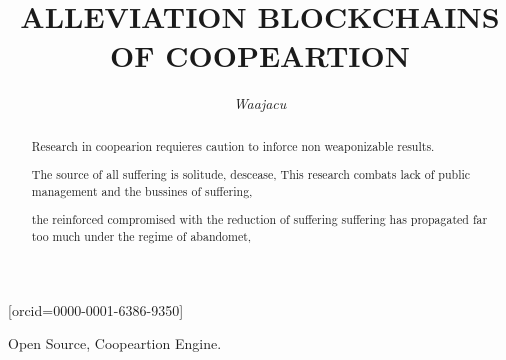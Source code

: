 \documentclass[a4paper,fleqn]{cas-sc}
\begin{document}
\let\WriteBookmarks\relax
\def\floatpagepagefraction{1}
\def\textpagefraction{.001}

\title[mode = title]{ALLEVIATION BLOCKCHAINS OF COOPEARTION}




  \author[1]{\textit{Waajacu}}[orcid=0000-0001-6386-9350]
  \cormark[1] 


  \address[1]{Santiago Restrepo Ruiz, Colombia.}





\begin{abstract}
  Research in coopearion requieres caution to inforce non weaponizable results. 



  The source of all suffering is solitude, descease, 
  This research combats lack of public management and the bussines of suffering, 
  
  the reinforced compromised with the reduction of suffering
  suffering has propagated far too much under the regime of abandomet, 

  
  
\end{abstract}
 \begin{keywords}
  Open Source, Coopeartion Engine. 
 \end{keywords}

 \maketitle
\end{document}
